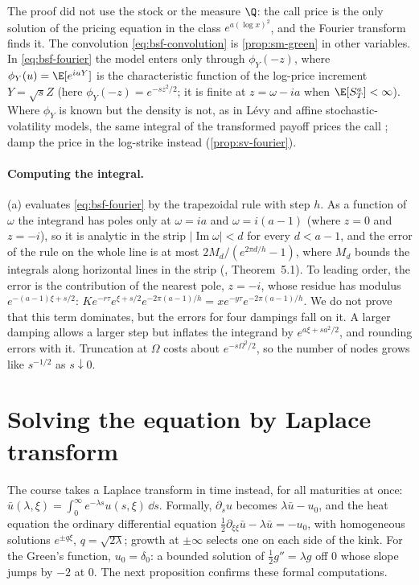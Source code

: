 The proof did not use the stock or the measure $\Q$: the call price is the only solution of the pricing
equation in the class $e^{a(\log x)^2}$, and the Fourier transform finds it. The convolution
\eqref{eq:bsf-convolution} is \cref{prop:sm-green} in other variables. In \eqref{eq:bsf-fourier} the model enters
only through $\phi_Y(-z)$, where $\phi_Y(u)=\E[e^{iuY}]$ is the characteristic function of the log-price increment
$Y=\sqrt sZ$ (here $\phi_Y(-z)=e^{-sz^2/2}$; it is finite at $z=\omega-ia$ when $\E[S_T^a]<\infty$). Where $\phi_Y$ is
known but the density is not, as in L\'evy and affine stochastic-volatility models, the same integral of the
transformed payoff prices the call \citep{lewis-2001}; \textcite{carr-madan-fft} damp the price in the
log-strike instead (\cref{prop:sv-fourier}).

\paragraph{Computing the integral.} (a) evaluates \eqref{eq:bsf-fourier} by the
trapezoidal rule with step $h$. As a function of $\omega$ the integrand has poles only at $\omega=ia$ and
$\omega=i(a-1)$ (where $z=0$ and $z=-i$), so it is analytic in the strip $|\operatorname{Im}\omega|<d$ for every
$d<a-1$, and the error of the rule on the whole line is at most $2M_d/(e^{2\pi d/h}-1)$, where $M_d$ bounds the
integrals along horizontal lines in the strip (\textcite{trefethen-weideman}, Theorem~5.1). To leading order,
the error is the contribution of the nearest pole, $z=-i$, whose residue has modulus $e^{-(a-1)\xi+s/2}$:
$Ke^{-r\tau}e^{\xi+s/2}e^{-2\pi(a-1)/h}=xe^{-y\tau}e^{-2\pi(a-1)/h}$. We do not prove that this term
dominates, but the errors for four dampings fall on it. A larger damping allows a larger step but inflates
the integrand by $e^{a\xi+sa^2/2}$, and rounding errors with it. Truncation at $\Omega$ costs about
$e^{-s\Omega^2/2}$, so the number of nodes grows like $s^{-1/2}$ as $s\downarrow0$.

\section{Solving the equation by Laplace transform}\label{sec:bsf-laplace}

The course takes a Laplace transform in time instead, for all maturities at once:
$\bar u(\lambda,\xi)=\int_0^\infty e^{-\lambda s}u(s,\xi)\,\dd s$. Formally, $\partial_su$ becomes $\lambda\bar u-u_0$,
and the heat equation the ordinary differential equation $\frac12\partial_{\xi\xi}\bar u-\lambda\bar u=-u_0$, with
homogeneous solutions $e^{\pm q\xi}$, $q=\sqrt{2\lambda}$; growth at $\pm\infty$ selects one on each side of the
kink. For the Green's function, $u_0=\delta_0$: a bounded solution of $\frac12g''=\lambda g$ off $0$ whose slope
jumps by $-2$ at $0$. The next proposition confirms these formal computations.

